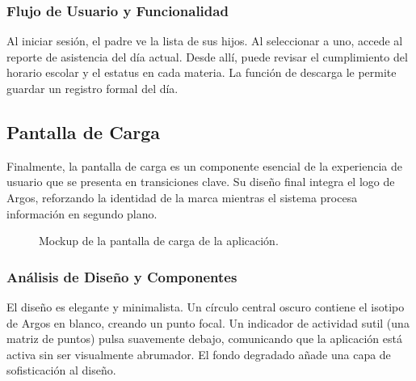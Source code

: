 \begin{samepage}
	\subsubsection*{Flujo de Usuario y Funcionalidad}
	Al iniciar sesión, el padre ve la lista de sus hijos. Al seleccionar a uno, accede al reporte de asistencia del día actual. Desde allí, puede revisar el cumplimiento del horario escolar y el estatus en cada materia. La función de descarga le permite guardar un registro formal del día.
\normalsize\end{samepage}
\clearpage

\subsection{ Pantalla de Carga}
\begin{samepage}\small
Finalmente, la pantalla de carga es un componente esencial de la experiencia de usuario que se presenta en transiciones clave. Su diseño final integra el logo de Argos, reforzando la identidad de la marca mientras el sistema procesa información en segundo plano.
\begin{figure}[H]
	\centering
	\caption{Mockup de la pantalla de carga de la aplicación.}\label{fig:mk-loader}
\end{figure}
	\subsubsection*{Análisis de Diseño y Componentes}
	El diseño es elegante y minimalista. Un círculo central oscuro contiene el isotipo de Argos en blanco, creando un punto focal. Un indicador de actividad sutil (una matriz de puntos) pulsa suavemente debajo, comunicando que la aplicación está activa sin ser visualmente abrumador. El fondo degradado añade una capa de sofisticación al diseño.
    

\end{samepage}
